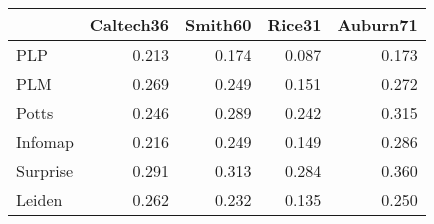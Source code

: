 \begin{tabular}{lrrrr}
\toprule
{} & Caltech36 & Smith60 & Rice31 & Auburn71 \\
\midrule
PLP      &     0.213 &   0.174 &  0.087 &    0.173 \\
PLM      &     0.269 &   0.249 &  0.151 &    0.272 \\
Potts    &     0.246 &   0.289 &  0.242 &    0.315 \\
Infomap  &     0.216 &   0.249 &  0.149 &    0.286 \\
Surprise &     0.291 &   0.313 &  0.284 &    0.360 \\
Leiden   &     0.262 &   0.232 &  0.135 &    0.250 \\
\bottomrule
\end{tabular}
